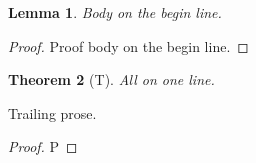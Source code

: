 \documentclass{amsart}
\newtheorem{theorem}{Theorem}[section]
\newtheorem{lemma}[theorem]{Lemma}
\begin{document}
\begin{lemma}\label{ed-0001} Body on the begin line.
\end{lemma}
\begin{proof} Proof body on the begin line. \end{proof}
\begin{theorem}[T]\label{ed-0002}All on one line. \end{theorem} Trailing prose. \begin{proof}P\end{proof}
\end{document}

